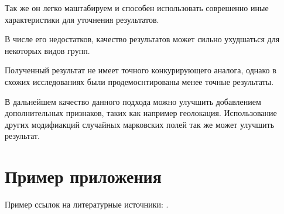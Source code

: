 \documentclass[annotation,times,page4]{itmo-student-thesis}
\begin{document}
Так же он легко маштабируем и способен использовать соврешенно иные характеристики для уточнения результатов.

В числе его недостатков, качество результатов может сильно ухудшаться для некоторых видов групп.

Полученный результат не имеет точного конкурирующего аналога, однако в схожих исследованиях были продемоснтированы менее точные результаты.

В дальнейшем качество данного подхода можно улучшить добавлением дополнительных признаков, таких как например геолокация. Использование других модифиакций случайных марковских полей так же может улучшить результат.


\printbibliography[heading=trueHeading]

\appendix

\chapter{Пример приложения}

Пример ссылок на литературные источники: \cite{example-english, example-russian}.
\end{document}
